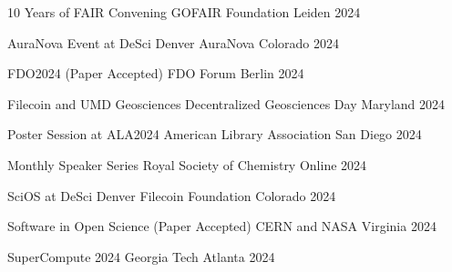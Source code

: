 
\begin{cvhonors}

  \cvhonor
    {10 Years of FAIR Convening} %
    {GOFAIR Foundation} %
    {Leiden} %
    {2024} %

  \cvhonor
    {AuraNova Event at DeSci Denver} %
    {AuraNova} %
    {Colorado} %
    {2024} %

  \cvhonor
    {FDO2024 (Paper Accepted)} %
    {FDO Forum} %
    {Berlin} %
    {2024} %

  \cvhonor
    {Filecoin and UMD Geosciences} %
    {Decentralized Geosciences Day} %
    {Maryland} %
    {2024} %


  \cvhonor
    {Poster Session at ALA2024} %
    {American Library Association} %
    {San Diego} %
    {2024} %


  \cvhonor
    {Monthly Speaker Series} %
    {Royal Society of Chemistry} %
    {Online} %
    {2024} %

  \cvhonor
    {SciOS at DeSci Denver} %
    {Filecoin Foundation} %
    {Colorado} %
    {2024} %

  \cvhonor
    {Software in Open Science (Paper Accepted)} %
    {CERN and NASA} %
    {Virginia} %
    {2024} %

  \cvhonor
    {SuperCompute 2024} %
    {Georgia Tech} %
    {Atlanta} %
    {2024} %


\end{cvhonors}

